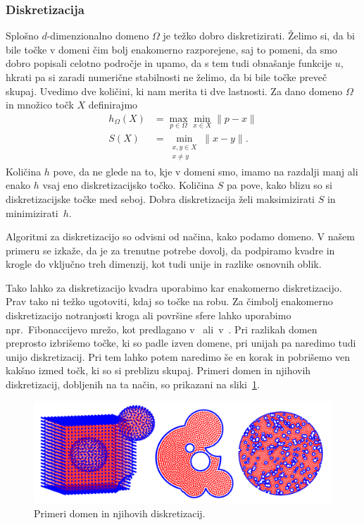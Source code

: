 \documentclass[12pt,a4paper,twoside]{article}
\theoremstyle{definition} %
\theoremstyle{plain} %
\numberwithin{equation}{section}
\begin{document}
\subsubsection{Diskretizacija}
Splošno $d$-dimenzionalno domeno $\Omega$ je težko dobro diskretizirati.
Želimo si, da bi bile točke v domeni čim bolj enakomerno razporejene, saj to
pomeni, da smo dobro popisali celotno področje in upamo, da s tem tudi obnašanje
funkcije $u$, hkrati pa si zaradi numerične stabilnosti ne želimo, da bi bile
točke preveč skupaj. Uvedimo dve količini, ki nam merita ti dve lastnosti.
Za dano domeno $\Omega$ in množico točk $X$ definirajmo
\begin{align}
  h_\Omega(X) &= \max_{p \in \Omega} \min_{x \in X} \|p - x\| \\
  \label{eq:def-hs}
  S(X) &= \min_{\substack{x, y \in X \\ x \neq y}} \|x-y\|. \nonumber
\end{align}
Količina $h$ pove, da ne glede na to, kje v domeni smo, imamo na razdalji manj ali enako $h$
vsaj eno diskretizacijsko točko. Količina $S$ pa pove, kako blizu so si
diskretizacijske točke med seboj. Dobra diskretizacija želi maksimizirati $S$ in
minimizirati~$h$.

Algoritmi za diskretizacijo so odvisni od načina, kako podamo domeno.
V našem primeru se izkaže, da je za trenutne potrebe dovolj, da podpiramo
kvadre in krogle do vključno treh dimenzij, kot tudi unije in razlike
osnovnih oblik.

Tako lahko za diskretizacijo kvadra uporabimo kar enakomerno diskretizacijo.
Prav tako ni težko ugotoviti, kdaj so točke na robu. Za čimbolj enakomerno
diskretizacijo notranjosti kroga ali površine sfere
lahko uporabimo npr.~Fibonaccijevo mrežo, kot predlagano
v~\cite{hannay2004fibonacci} ali~v~\cite{gonzalez2010measurement}.
Pri razlikah domen preprosto izbrišemo točke, ki so padle izven domene,
pri unijah pa naredimo tudi unijo diskretizacij. Pri tem lahko potem naredimo še
en korak in pobrišemo ven kakšno izmed točk, ki so si preblizu skupaj.
Primeri domen in njihovih diskretizacij, dobljenih na ta način, so prikazani na sliki~\ref{fig:domains}.
\begin{figure}[!ht]
  \centering
  \includegraphics[width=\textwidth]{images/domains_generated.png}
  \caption{Primeri domen in njihovih diskretizacij.}
  \label{fig:domains}
\end{figure}
\end{document}
